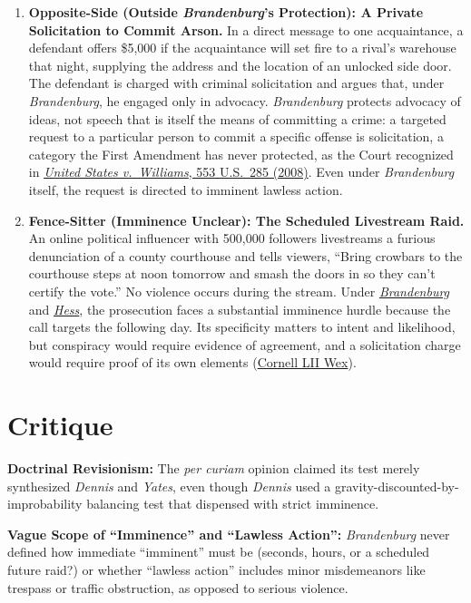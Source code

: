 \documentclass[12pt]{article}
\begin{document}
\begin{enumerate}
\item \textbf{Opposite-Side (Outside \textit{Brandenburg}'s Protection): A Private Solicitation to Commit Arson.} In a direct message to one acquaintance, a defendant offers \$5,000 if the acquaintance will set fire to a rival's warehouse that night, supplying the address and the location of an unlocked side door. The defendant is charged with criminal solicitation and argues that, under \textit{Brandenburg}, he engaged only in advocacy. \textit{Brandenburg} protects advocacy of ideas, not speech that is itself the means of committing a crime: a targeted request to a particular person to commit a specific offense is solicitation, a category the First Amendment has never protected, as the Court recognized in \href{https://supreme.justia.com/cases/federal/us/553/285/}{\emph{United States v.\ Williams}, 553 U.S.\ 285 (2008)}. Even under \textit{Brandenburg} itself, the request is directed to imminent lawless action.

\item \textbf{Fence-Sitter (Imminence Unclear): The Scheduled Livestream Raid.} An online political influencer with 500,000 followers livestreams a furious denunciation of a county courthouse and tells viewers, ``Bring crowbars to the courthouse steps at noon tomorrow and smash the doors in so they can't certify the vote.'' No violence occurs during the stream. Under \href{https://supreme.justia.com/cases/federal/us/395/444/}{\emph{Brandenburg}} and \href{https://supreme.justia.com/cases/federal/us/414/105/}{\emph{Hess}}, the prosecution faces a substantial imminence hurdle because the call targets the following day. Its specificity matters to intent and likelihood, but conspiracy would require evidence of agreement, and a solicitation charge would require proof of its own elements (\href{https://www.law.cornell.edu/wex/imminent_lawless_action}{Cornell LII Wex}).

\end{enumerate}

\section{Critique}
\textbf{Doctrinal Revisionism:} The \emph{per curiam} opinion claimed its test merely synthesized \emph{Dennis} and \emph{Yates}, even though \emph{Dennis} used a gravity-discounted-by-improbability balancing test that dispensed with strict imminence.

\textbf{Vague Scope of ``Imminence'' and ``Lawless Action'':} \emph{Brandenburg} never defined how immediate ``imminent'' must be (seconds, hours, or a scheduled future raid?) or whether ``lawless action'' includes minor misdemeanors like trespass or traffic obstruction, as opposed to serious violence.
\end{document}
